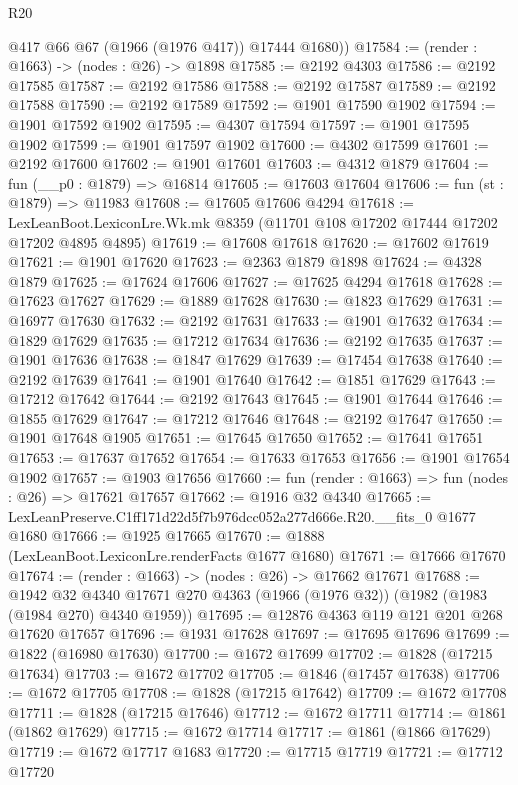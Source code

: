 \begin{lexlean}{R20}
\begin{coremodule}
        @417
        @66
        @67
        (@1966 (@1976 @417))
        @17444
        @1680))
@17584 := (render : @1663) -> (nodes : @26) -> @1898
@17585 := @2192 @4303
@17586 := @2192 @17585
@17587 := @2192 @17586
@17588 := @2192 @17587
@17589 := @2192 @17588
@17590 := @2192 @17589
@17592 := @1901 @17590 @1902
@17594 := @1901 @17592 @1902
@17595 := @4307 @17594
@17597 := @1901 @17595 @1902
@17599 := @1901 @17597 @1902
@17600 := @4302 @17599
@17601 := @2192 @17600
@17602 := @1901 @17601
@17603 := @4312 @1879
@17604 := fun (__p0 : @1879) => @16814
@17605 := @17603 @17604
@17606 := fun (st : @1879) => @11983
@17608 := @17605 @17606 @4294
@17618 := LexLeanBoot.LexiconLre.Wk.mk @8359 (@11701 @108 @17202 @17444 @17202 @17202 @4895 @4895)
@17619 := @17608 @17618
@17620 := @17602 @17619
@17621 := @1901 @17620
@17623 := @2363 @1879 @1898
@17624 := @4328 @1879
@17625 := @17624 @17606
@17627 := @17625 @4294 @17618
@17628 := @17623 @17627
@17629 := @1889 @17628
@17630 := @1823 @17629
@17631 := @16977 @17630
@17632 := @2192 @17631
@17633 := @1901 @17632
@17634 := @1829 @17629
@17635 := @17212 @17634
@17636 := @2192 @17635
@17637 := @1901 @17636
@17638 := @1847 @17629
@17639 := @17454 @17638
@17640 := @2192 @17639
@17641 := @1901 @17640
@17642 := @1851 @17629
@17643 := @17212 @17642
@17644 := @2192 @17643
@17645 := @1901 @17644
@17646 := @1855 @17629
@17647 := @17212 @17646
@17648 := @2192 @17647
@17650 := @1901 @17648 @1905
@17651 := @17645 @17650
@17652 := @17641 @17651
@17653 := @17637 @17652
@17654 := @17633 @17653
@17656 := @1901 @17654 @1902
@17657 := @1903 @17656
@17660 := fun (render : @1663) => fun (nodes : @26) => @17621 @17657
@17662 := @1916 @32 @4340
@17665 := LexLeanPreserve.C1ff171d22d5f7b976dcc052a277d666e.R20.__fits_0 @1677 @1680
@17666 := @1925 @17665
@17670 := @1888 (LexLeanBoot.LexiconLre.renderFacts @1677 @1680)
@17671 := @17666 @17670
@17674 := (render : @1663) -> (nodes : @26) -> @17662 @17671
@17688 := @1942
    @32
    @4340
    @17671
    @270
    @4363
    (@1966 (@1976 @32))
    (@1982 (@1983 (@1984 @270) @4340 @1959))
@17695 := @12876 @4363 @119 @121 @201 @268 @17620 @17657
@17696 := @1931 @17628
@17697 := @17695 @17696
@17699 := @1822 (@16980 @17630)
@17700 := @1672 @17699
@17702 := @1828 (@17215 @17634)
@17703 := @1672 @17702
@17705 := @1846 (@17457 @17638)
@17706 := @1672 @17705
@17708 := @1828 (@17215 @17642)
@17709 := @1672 @17708
@17711 := @1828 (@17215 @17646)
@17712 := @1672 @17711
@17714 := @1861 (@1862 @17629)
@17715 := @1672 @17714
@17717 := @1861 (@1866 @17629)
@17719 := @1672 @17717 @1683
@17720 := @17715 @17719
@17721 := @17712 @17720

\end{coremodule}
\end{lexlean}
